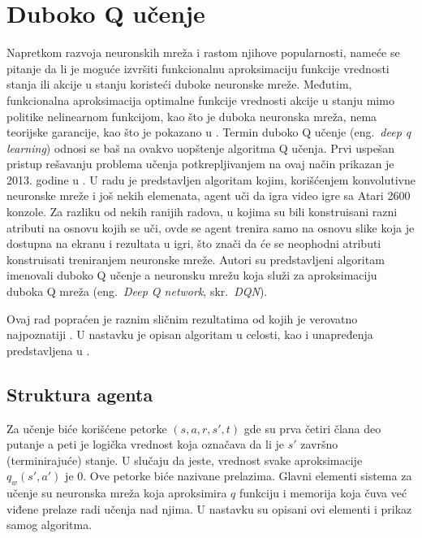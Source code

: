 

\section{Duboko Q učenje}

Napretkom razvoja neuronskih mreža i rastom njihove popularnosti, nameće se pitanje da li je moguće izvršiti funkcionalnu aproksimaciju funkcije vrednosti stanja ili akcije u stanju koristeći duboke neuronske mreže. Međutim, funkcionalna aproksimacija optimalne funkcije vrednosti akcije u stanju mimo politike nelinearnom funkcijom, kao što je duboka neuronska mreža, nema teorijske garancije, kao što je pokazano u \cite{q_nn_div}.  Termin duboko Q učenje (eng.~{\em deep q learning}) odnosi se baš na ovakvo uopštenje algoritma Q učenja. Prvi uspešan pristup rešavanju problema učenja potkrepljivanjem na ovaj način prikazan je 2013. godine u \cite{dqn_mnih}. U radu je predstavljen algoritam kojim, korišćenjem konvolutivne neuronske mreže i još nekih elemenata, agent uči da igra video igre sa Atari 2600 konzole. Za razliku od nekih ranijih radova, u kojima su bili konstruisani razni atributi na osnovu kojih se uči, ovde se agent trenira samo na osnovu slike koja je dostupna na ekranu i rezultata u igri, što znači da će se neophodni atributi konstruisati treniranjem neuronske mreže. 
Autori su predstavljeni algoritam imenovali duboko Q učenje a neuronsku mrežu koja služi za aproksimaciju duboka Q mreža (eng.~{\em Deep Q network}, skr.~{\em DQN}).
\par 
Ovaj rad popraćen je raznim sličnim rezultatima od kojih je verovatno najpoznatiji \cite{dqn_dm}.  U nastavku je opisan algoritam u celosti, kao i unapređenja predstavljena u \cite{dqn_mnih}.

\subsection{Struktura agenta}

Za učenje biće korišćene petorke $(s, a, r, s', t)$ gde su prva četiri člana deo putanje a peti je logička vrednost koja označava da li je $s'$ završno (terminirajuće) stanje. U slučaju da jeste, vrednost svake aproksimacije $q_w(s',a')$ je $0$. Ove petorke biće nazivane prelazima. Glavni elementi sistema za učenje su neuronska mreža koja aproksimira $q$ funkciju i memorija koja čuva već viđene prelaze radi učenja nad njima. U nastavku su opisani ovi elementi i prikaz samog algoritma.

